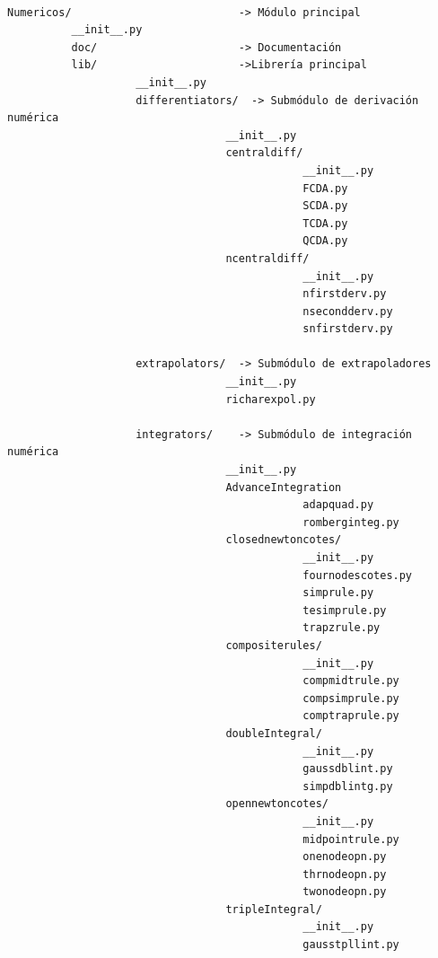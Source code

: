 \documentclass[letterpaper,10pt,oneside]{sphinxmanual}
\theoremstyle{plain}%
\theoremstyle{definition}%
\theoremstyle{remark}%
\begin{document}
\begin{verbatim}

Numericos/                          -> Módulo principal
          __init__.py
          doc/                      -> Documentación
          lib/                      ->Librería principal
                    __init__.py
                    differentiators/  -> Submódulo de derivación numérica
                                  __init__.py
                                  centraldiff/
                                              __init__.py
                                              FCDA.py
                                              SCDA.py
                                              TCDA.py
                                              QCDA.py
                                  ncentraldiff/
                                              __init__.py
                                              nfirstderv.py
                                              nsecondderv.py
                                              snfirstderv.py
                                              
                    extrapolators/  -> Submódulo de extrapoladores
                                  __init__.py
                                  richarexpol.py
                                  
                    integrators/    -> Submódulo de integración numérica
                                  __init__.py
                                  AdvanceIntegration
                                              adapquad.py
                                              romberginteg.py
                                  closednewtoncotes/
                                              __init__.py
                                              fournodescotes.py
                                              simprule.py
                                              tesimprule.py
                                              trapzrule.py
                                  compositerules/
                                              __init__.py
                                              compmidtrule.py
                                              compsimprule.py
                                              comptraprule.py
                                  doubleIntegral/
                                              __init__.py
                                              gaussdblint.py
                                              simpdblintg.py
                                  opennewtoncotes/
                                              __init__.py
                                              midpointrule.py
                                              onenodeopn.py
                                              thrnodeopn.py
                                              twonodeopn.py
                                  tripleIntegral/
                                              __init__.py
                                              gausstpllint.py
			                                  

\end{verbatim}
\end{document}
